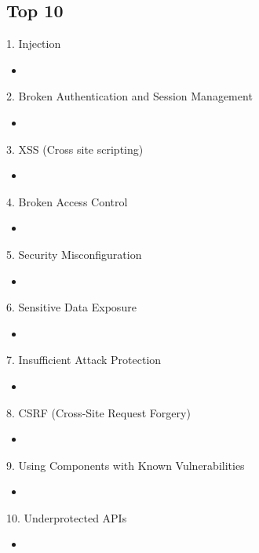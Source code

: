 \documentclass{beamer}
\begin{document}
	\subsection{Top 10}
	\begin{frame}{1. Injection}
		\begin{itemize}
			\item %
		\end{itemize}
	\end{frame}
	\begin{frame}{2. Broken Authentication and Session Management}
		\begin{itemize}
			\item %
		\end{itemize}
	\end{frame}
	\begin{frame}{3. XSS (Cross site scripting)}
		\begin{itemize}
			\item %
		\end{itemize}
	\end{frame}
	\begin{frame}{4. Broken Access Control}
		\begin{itemize}
			\item %
		\end{itemize}
	\end{frame}
	\begin{frame}{5. Security Misconfiguration}
		\begin{itemize}
		\item %
		\end{itemize}
	\end{frame}
	\begin{frame}{6. Sensitive Data Exposure}
		\begin{itemize}
			\item %
		\end{itemize}
	\end{frame}
	\begin{frame}{7. Insufficient Attack Protection}
		\begin{itemize}
			\item %
		\end{itemize}
	\end{frame}
	\begin{frame}{8. CSRF (Cross-Site Request Forgery)}
		\begin{itemize}
			\item %
		\end{itemize}
	\end{frame}
	\begin{frame}{9. Using Components with Known Vulnerabilities}
		\begin{itemize}
			\item %
		\end{itemize}
	\end{frame}
	\begin{frame}{10. Underprotected APIs}
		\begin{itemize}
			\item %
		\end{itemize}
	\end{frame}
	
\end{document}
